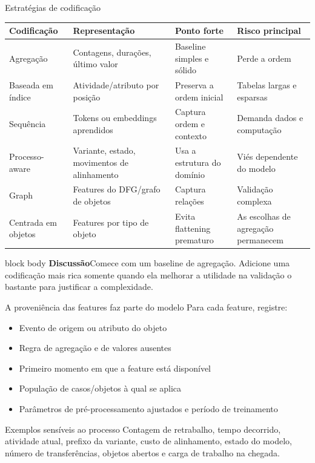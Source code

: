 \documentclass[aspectratio=169,11pt]{beamer}
\newcommand{\promptbox}[1]{%
  \begin{beamercolorbox}[rounded=true,sep=0.65em]{block body}
    \textbf{\color{Coral}Discussão}\quad #1
  \end{beamercolorbox}
}
\begin{document}
\begin{frame}{Estratégias de codificação}
  \scriptsize
  \begin{tabular}{@{}
    >{\raggedright\arraybackslash}p{}
    >{\raggedright\arraybackslash}p{}
    >{\raggedright\arraybackslash}p{}
    >{\raggedright\arraybackslash}p{}@{}}
    \toprule
    Codificação & Representação & Ponto forte & Risco principal\\
    \midrule
    Agregação & Contagens, durações, último valor & Baseline simples e sólido & Perde a ordem\\
    Baseada em índice & Atividade/atributo por posição & Preserva a ordem inicial & Tabelas largas e esparsas\\
    Sequência & Tokens ou embeddings aprendidos & Captura ordem e contexto & Demanda dados e computação\\
    Processo-aware & Variante, estado, movimentos de alinhamento & Usa a estrutura do domínio & Viés dependente do modelo\\
    Graph & Features do DFG/grafo de objetos & Captura relações & Validação complexa\\
    Centrada em objetos & Features por tipo de objeto & Evita flattening prematuro & As escolhas de agregação permanecem\\
    \bottomrule
  \end{tabular}
  \vspace{0.45cm}
  \promptbox{Comece com um baseline de agregação. Adicione uma codificação mais rica somente quando ela melhorar a utilidade na validação o bastante para justificar a complexidade.}
\end{frame}

\begin{frame}{A proveniência das features faz parte do modelo}
  Para cada feature, registre:
  \begin{itemize}
    \item Evento de origem ou atributo do objeto
    \item Regra de agregação e de valores ausentes
    \item Primeiro momento em que a feature está disponível
    \item População de casos/objetos à qual se aplica
    \item Parâmetros de pré-processamento ajustados e período de treinamento
  \end{itemize}
  \vspace{0.35cm}
  \begin{block}{Exemplos sensíveis ao processo}
    Contagem de retrabalho, tempo decorrido, atividade atual, prefixo da variante, custo de alinhamento, estado do modelo, número de transferências, objetos abertos e carga de trabalho na chegada.
  \end{block}
\end{frame}
\end{document}

